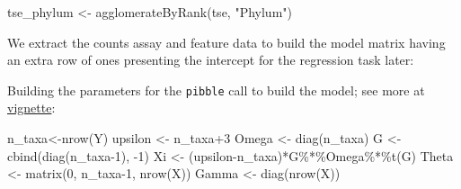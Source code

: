 \documentclass[
]{book}
\newenvironment{Shaded}{\begin{snugshade}}{\end{snugshade}}
\newcommand{\AttributeTok}[1]{\textcolor[rgb]{0.77,0.63,0.00}{#1}}
\newcommand{\CommentTok}[1]{\textcolor[rgb]{0.56,0.35,0.01}{\textit{#1}}}
\newcommand{\DecValTok}[1]{\textcolor[rgb]{0.00,0.00,0.81}{#1}}
\newcommand{\FunctionTok}[1]{\textcolor[rgb]{0.00,0.00,0.00}{#1}}
\newcommand{\NormalTok}[1]{#1}
\newcommand{\OtherTok}[1]{\textcolor[rgb]{0.56,0.35,0.01}{#1}}
\newcommand{\SpecialCharTok}[1]{\textcolor[rgb]{0.00,0.00,0.00}{#1}}
\newcommand{\StringTok}[1]{\textcolor[rgb]{0.31,0.60,0.02}{#1}}
\begin{document}
\begin{Shaded}
\begin{Highlighting}[]
\NormalTok{tse\_phylum }\OtherTok{\textless{}{-}} \FunctionTok{agglomerateByRank}\NormalTok{(tse, }\StringTok{"Phylum"}\NormalTok{)}
\end{Highlighting}
\end{Shaded}

We extract the counts assay and feature data to build the model matrix having
an extra row of ones presenting the intercept for the regression task later:

\begin{Shaded}
\end{Shaded}

Building the parameters for the \texttt{pibble} call to build the model; see more at \href{https://jsilve24.github.io/fido/articles/introduction-to-fido.html}{vignette}:

\begin{Shaded}
\begin{Highlighting}[]
\NormalTok{n\_taxa}\OtherTok{\textless{}{-}}\FunctionTok{nrow}\NormalTok{(Y)}
\NormalTok{upsilon }\OtherTok{\textless{}{-}}\NormalTok{ n\_taxa}\SpecialCharTok{+}\DecValTok{3}
\NormalTok{Omega }\OtherTok{\textless{}{-}} \FunctionTok{diag}\NormalTok{(n\_taxa)}
\NormalTok{G }\OtherTok{\textless{}{-}} \FunctionTok{cbind}\NormalTok{(}\FunctionTok{diag}\NormalTok{(n\_taxa}\DecValTok{{-}1}\NormalTok{), }\SpecialCharTok{{-}}\DecValTok{1}\NormalTok{)}
\NormalTok{Xi }\OtherTok{\textless{}{-}}\NormalTok{ (upsilon}\SpecialCharTok{{-}}\NormalTok{n\_taxa)}\SpecialCharTok{*}\NormalTok{G}\SpecialCharTok{\%*\%}\NormalTok{Omega}\SpecialCharTok{\%*\%}\FunctionTok{t}\NormalTok{(G)}
\NormalTok{Theta }\OtherTok{\textless{}{-}} \FunctionTok{matrix}\NormalTok{(}\DecValTok{0}\NormalTok{, n\_taxa}\DecValTok{{-}1}\NormalTok{, }\FunctionTok{nrow}\NormalTok{(X))}
\NormalTok{Gamma }\OtherTok{\textless{}{-}} \FunctionTok{diag}\NormalTok{(}\FunctionTok{nrow}\NormalTok{(X))}
\end{Highlighting}
\end{Shaded}
\end{document}
